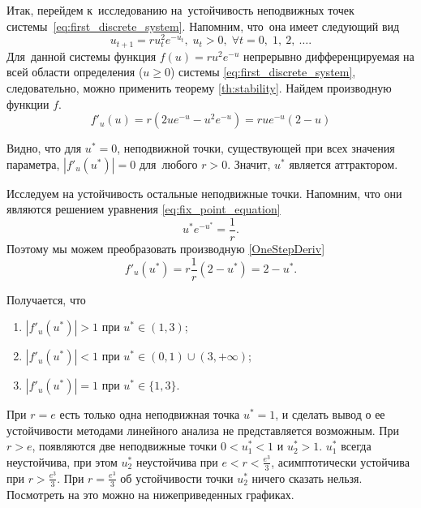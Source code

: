 Итак, перейдем к~исследованию на~устойчивость неподвижных точек системы~\ref{eq:first_discrete_system}. Напомним, что~она имеет следующий вид
$$
        u_{t+1} = r u_t^2 e^{-u_t},\; u_t > 0,\; \forall t = 0,\; 1,\: 2,\: \dots .
$$
Для~данной системы функция $f(u) = r u^2 e^{-u}$ непрерывно дифференцируемая на всей области определения ($u \geqslant 0 $) системы \ref{eq:first_discrete_system}, следовательно, можно применить теорему \ref{th:stability}. Найдем производную функции $f$.
\begin{equation} \label{OneStepDeriv}
        f'_u(u) = r (2u e^{-u} - u^2 e^{-u}) = r u e^{-u} (2 - u)
\end{equation} 

Видно, что для $u^* = 0$, неподвижной точки, существующей при всех значения параметра, $|f'_u(u^*)| = 0$ для~любого $r > 0$. Значит, $u^*$ является аттрактором.

Исследуем на устойчивость остальные неподвижные точки. Напомним, что они являются решением уравнения \ref{eq:fix_point_equation}
$$
        u^* e^{-u^*} = \frac{1}{r}.
$$
Поэтому мы можем преобразовать производную \ref{OneStepDeriv}
\begin{equation}
        f'_u(u^*) = r \frac{1}{r} (2 - u^*) = 2 - u^*.
\end{equation}

Получается, что
\begin{enumerate}
        \item $|f'_u(u^*)| > 1$ при $u^* \in (1, 3)$;
        \item $|f'_u(u^*)| < 1$ при $u^* \in (0, 1) \cup (3, +\infty)$;
        \item $|f'_u(u^*)| = 1$ при $u^* \in \{1, 3\}$.
\end{enumerate}
            
При $r = e$ есть только одна неподвижная точка $u^* = 1$, и сделать вывод о ее устойчивости методами линейного анализа не представляется возможным. При $r > e$, появляются две неподвижные точки $0 < u_1^* < 1$ и $u_2^* > 1$. $u_1^*$ всегда неустойчива, при этом $u_2^*$ неустойчива при $e<r<\frac{e^3}{3}$, асимптотически устойчива при $r > \frac{e^3}{3}$. При $r = \frac{e^3}{3}$ об устойчивости точки $u_2^*$ ничего сказать нельзя. Посмотреть на это можно на нижеприведенных графиках.

